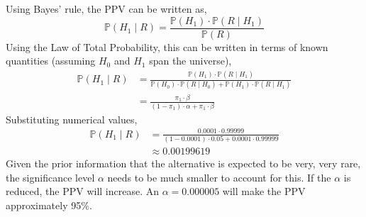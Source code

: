 \documentclass[12pt,twoside]{article}
\begin{document}
\begin{problems}
\newpage

\problem  %

\begin{problemparts}

\problempart  %

Using Bayes' rule, the PPV can be written as,
$$ \mathbb{P}(H_1 \mid R) = \frac{\mathbb{P}(H_1) \cdot \mathbb{P}(R \mid
H_1)}{\mathbb{P}(R)} $$
Using the Law of Total Probability, this can be written in terms of known
quantities (assuming $H_0$ and $H_1$ span the universe),
\begin{align*}
    \mathbb{P}(H_1 \mid R) &= \frac{\mathbb{P}(H_1) \cdot \mathbb{P}(R \mid
    H_1)}{\mathbb{P}(H_0) \cdot \mathbb{P}(R \mid H_0) + \mathbb{P}(H_1)
    \cdot \mathbb{P}(R \mid H_1)} \\
    &= \boxed{\frac{\pi_1 \cdot \beta}{(1 - \pi_1) \cdot \alpha + \pi_1 \cdot
    \beta}}
\end{align*}
Substituting numerical values,
\begin{align*}
    \mathbb{P}(H_1 \mid R) &= \frac{0.0001 \cdot 0.99999}{(1 - 0.0001) \cdot
    0.05 + 0.0001 \cdot 0.99999} \\
    &\approx \boxed{0.00199619}
\end{align*}
Given the prior information that the alternative is expected to be very, very
rare, the significance level $\alpha$ needs to be much smaller to account for
this. If the $\alpha$ is reduced, the PPV will increase. An $\alpha =
0.000005$ will make the PPV approximately 95\%.

\problempart  %


\end{problemparts}
\end{problems}
\end{document}
